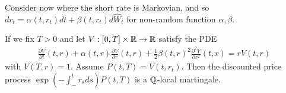 \begin{thm}
  \label{sec:interest-rate-models-5}
  Consider now where the short rate is Markovian, and so $dr_{t} =
  \alpha(t, r_{t}) dt + \beta(t, r_{t}) d \hat W_{t}$ for non-random
  function $\alpha, \beta$.

  If we fix $T > 0$ and let $V: [0, T] \times \mathbb{R} \rightarrow \mathbb{R}$
  satisfy the PDE
  \begin{align}
    \label{eq:29}
    \frac{\partial V}{\partial t}(t, r) + \alpha(t, r) \frac{\partial
      V}{\partial r}(t, r) + \frac{1}{2} \beta(t, r)^{2}
    \frac{\partial^{2} V}{\partial r^{2}}(t, r) = rV(t, r)
  \end{align} with $V(T, r) = 1$.  Assume $P(t, T) = V(t, r_{t})$.
  Then the discounted price process $\exp(-\int_{-}^{t} r_{s} ds) P(t,
  T)$ is a $\Q$-local martingale.
\end{thm}





